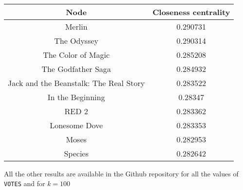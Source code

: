 \begin{table}[h!]
    \centering
     \begin{tabular}{||c c||}
     \hline
     Node & Closeness centrality \\ [0.5ex]
     \hline\hline
     Merlin & 0.290731 \\
     The Odyssey & 0.290314 \\
     The Color of Magic	& 0.285208 \\
     The Godfather Saga	& 0.284932 \\
     Jack and the Beanstalk: The Real Story & 0.283522 \\
     In the Beginning & 0.28347 \\
     RED 2 & 0.283362 \\
     Lonesome Dove & 0.283353 \\
     Moses & 0.282953 \\
     Species & 0.282642 \\ [1ex]
     \hline
     \end{tabular}
\end{table}

\nd All the other results are available in the Github repository for all the values of \texttt{VOTES} and for $k=100$
